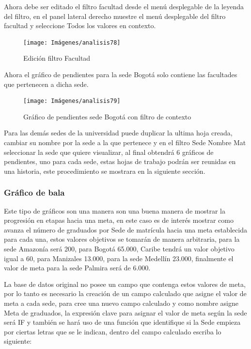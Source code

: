 \documentclass[
]{book}
\begin{document}
Ahora debe ser editado el filtro facultad desde el menú desplegable de la leyenda del filtro, en el panel lateral derecho muestre el menú desplegable del filtro facultad y seleccione Todos los valores en contexto.

\begin{figure}

{\centering \texttt{[image: Imágenes/analisis78]} 

}

\caption{Edición filtro Facultad}\label{fig:facultadcontextobogota-fig}
\end{figure}

Ahora el gráfico de pendientes para la sede Bogotá solo contiene las facultades que pertenecen a dicha sede.

\begin{figure}

{\centering \texttt{[image: Imágenes/analisis79]} 

}

\caption{Gráfico de pendientes sede Bogotá con filtro de contexto}\label{fig:graficopendientecontextobogota-fig}
\end{figure}

Para las demás sedes de la universidad puede duplicar la ultima hoja creada, cambiar su nombre por la sede a la que pertenece y en el filtro Sede Nombre Mat seleccionar la sede que quiere visualizar, al final obtendrá 6 gráficos de pendientes, uno para cada sede, estas hojas de trabajo podrán ser reunidas en una historia, este procedimiento se mostrara en la siguiente sección.

\hypertarget{graficobala}{%
\subsubsection{Gráfico de bala}\label{graficobala}}

Este tipo de gráficos son una manera son una buena manera de mostrar la progresión en etapas hacia una meta, en este caso es de interés mostrar como avanza el número de graduados por Sede de matrícula hacia una meta establecida para cada una, estos valores objetivos se tomarán de manera arbitraria, para la sede Amazonía será 200, para Bogotá 65.000, Caribe tendrá un valor objetivo igual a 60, para Manizales 13.000, para la sede Medellín 23.000, finalmente el valor de meta para la sede Palmira será de 6.000.

La base de datos original no posee un campo que contenga estos valores de meta, por lo tanto es necesario la creación de un campo calculado que asigne el valor de meta a cada sede, para cree una nuevo campo calculado y como nombre asigne Meta de graduados, la expresión clave para asignar el valor de meta según la sede será IF y también se hará uso de una función que identifique si la Sede empieza por ciertas letras que se le indican, dentro del campo calculado escriba lo siguiente:
\end{document}

